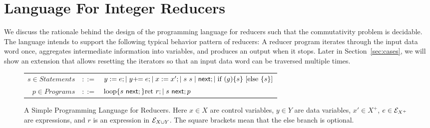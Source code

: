  
\section{Language For Integer Reducers}\label{sec-mr-prog}
\label{sec:language}
We discuss the rationale behind the design of the programming language for reducers such that the commutativity problem is decidable. The language intends to support the following typical behavior pattern of reducers: A reducer program iterates through the input data word once, aggregates intermediate information into variables, and produces an output when it stops. 
%
Later in Section~\ref{sec:cases}, we will show an extension that allows resetting the iterators so that an input data word can be traversed multiple times.

\begin{figure}

	\centering
	\begin{tabular}{rcl}
        $ s \in Statements$&$::=$&$y := e;\mid y +\!\!= e; \mid x:=x';\mid s\ s\mid \mathsf{next}; \mid \mbox{if } (g) \{s\} \mbox{ [else } \{s\}\mbox{]}$\\
		$ p\in Programs$&$::=$&$\loopL{s\ \nnext;}\mbox{ret }r; \mid s\ \nnext;p$		
	\end{tabular}
	\caption{A Simple Programming Language for Reducers. Here $x\in X$ are control variables, $y\in Y$ are data variables, $x' \in X^+$, $e\in {\mathcal{E} }_{X^+}$ are expressions, and $r$ is an expression in ${\mathcal{E} }_{X \cup Y}$. The square brackets mean that the else branch is optional. }
	\label{fig:language}
		\vspace{-0.5cm}
\end{figure}

